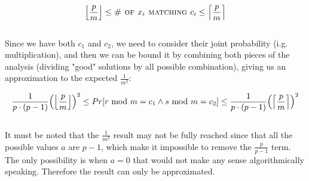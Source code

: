 \documentclass[a4paper]{article}
\begin{document}
\[
\Bigl \lfloor \frac{p}{m} \Bigr \rfloor \le \textsc{\# of $x_i$ matching } c_i \le \Bigl \lceil \frac{p}{m} \Bigr\rceil
\]
\qquad \\
Since we have both $c_1$ and $c_2$, we need to consider their joint probability (i.g. multiplication), and then we can be bound it by combining both pieces of the analysis (dividing "good" solutions by all possible combination), giving us an approximation to the expected $\frac{1}{m^2}$:

$$
\frac{1}{p\cdot(p-1)}\Bigl(\Bigl\lfloor\frac{p}{m}\Bigr\rfloor\Bigr)^2  \le {Pr}[r \text{ mod } m = c_1 \wedge s \text{ mod } m  = c_2] \le \frac{1}{p\cdot(p-1)}\Bigl(\Bigl\lceil\frac{p}{m}\Bigr\rceil\Bigr)^2 
$$
\qquad \\
It must be noted that the $\frac{1}{m^2}$ result may not be fully reached since that all the possible values $a$ are $p-1$, which make it impossible to remove the $\frac{p}{p-1}$ term. The only possibility is when $a = 0$ that would not make any sense algorithmically speaking. Therefore the result can only be approximated.
\end{document}
